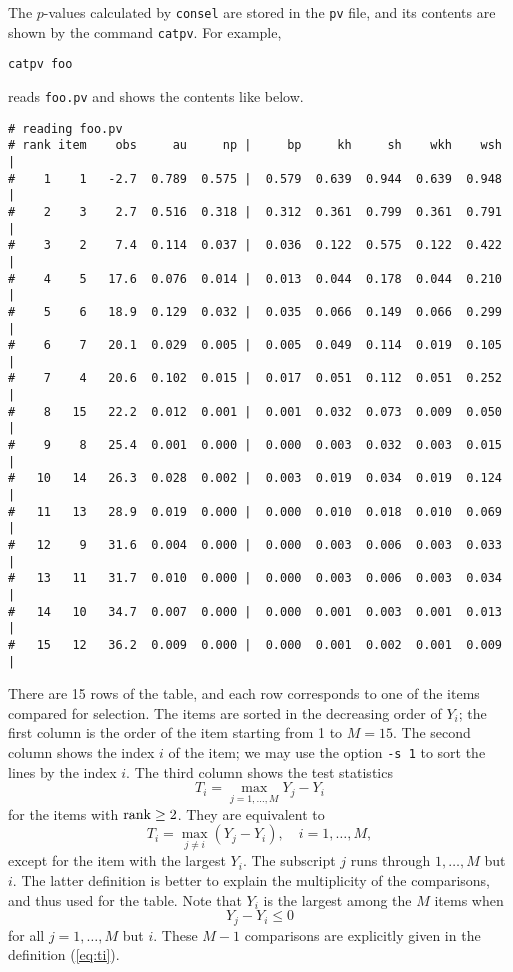 \documentclass[12pt]{article}
\newcommand{\refeq}[1]{(\ref{eq:#1})}
\begin{document}
The $p$-values calculated by {\tt consel} are stored in the {\tt pv}
file, and its contents are shown by the command {\tt catpv}. For
example,
\begin{verbatim}
catpv foo
\end{verbatim}
reads {\tt foo.pv} and shows the contents like below.
{\small
\begin{verbatim}
# reading foo.pv
# rank item    obs     au     np |     bp     kh     sh    wkh    wsh |
#    1    1   -2.7  0.789  0.575 |  0.579  0.639  0.944  0.639  0.948 |
#    2    3    2.7  0.516  0.318 |  0.312  0.361  0.799  0.361  0.791 |
#    3    2    7.4  0.114  0.037 |  0.036  0.122  0.575  0.122  0.422 |
#    4    5   17.6  0.076  0.014 |  0.013  0.044  0.178  0.044  0.210 |
#    5    6   18.9  0.129  0.032 |  0.035  0.066  0.149  0.066  0.299 |
#    6    7   20.1  0.029  0.005 |  0.005  0.049  0.114  0.019  0.105 |
#    7    4   20.6  0.102  0.015 |  0.017  0.051  0.112  0.051  0.252 |
#    8   15   22.2  0.012  0.001 |  0.001  0.032  0.073  0.009  0.050 |
#    9    8   25.4  0.001  0.000 |  0.000  0.003  0.032  0.003  0.015 |
#   10   14   26.3  0.028  0.002 |  0.003  0.019  0.034  0.019  0.124 |
#   11   13   28.9  0.019  0.000 |  0.000  0.010  0.018  0.010  0.069 |
#   12    9   31.6  0.004  0.000 |  0.000  0.003  0.006  0.003  0.033 |
#   13   11   31.7  0.010  0.000 |  0.000  0.003  0.006  0.003  0.034 |
#   14   10   34.7  0.007  0.000 |  0.000  0.001  0.003  0.001  0.013 |
#   15   12   36.2  0.009  0.000 |  0.000  0.001  0.002  0.001  0.009 |
\end{verbatim}
}

There are 15 rows of the table, and each row corresponds to one of the
items compared for selection. The items are sorted in the decreasing
order of $Y_i$; the first column is the order of the item starting from
1 to $M=15$.  The second column shows the index $i$ of the item; we may
use the option {\tt -s 1} to sort the lines by the index $i$.  The third
column shows the test statistics \[ T_i = \max_{j=1,\ldots,M} Y_j - Y_i
\] for the items with ${\rm rank} \ge 2$. They are equivalent to
\begin{equation}
 T_i = \max_{j\neq i} (Y_j - Y_i), \quad i=1,\ldots,M, \label{eq:ti}
\end{equation}
except for the item with the largest $Y_i$. The subscript $j$ runs
through $1,\ldots,M$ but $i$. The latter definition is better to explain
the multiplicity of the comparisons, and thus used for the table. Note
that $Y_i$ is the largest among the $M$ items when \[ Y_j - Y_i \le 0 \]
for all $j=1,\ldots,M$ but $i$. These $M-1$ comparisons are explicitly
given in the definition \refeq{ti}.
\end{document}
